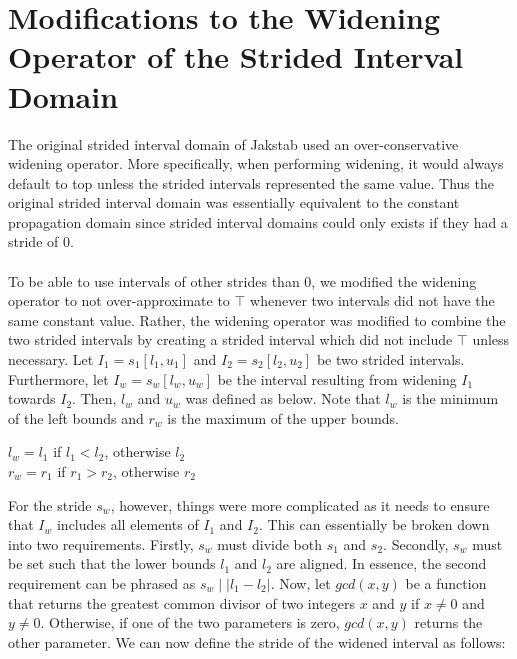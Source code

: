 \documentclass{kththesis}
\begin{document}
\clearpage
\section{Modifications to the Widening Operator of the Strided Interval Domain}
The original strided interval domain of Jakstab used an over-conservative widening operator. More specifically, when performing widening, it would always default to top unless the strided intervals represented the same value. Thus the original strided interval domain was essentially equivalent to the constant propagation domain since strided interval domains could only exists if they had a stride of $0$.
\\ \\
To be able to use intervals of other strides than $0$, we modified the widening operator to not over-approximate to $\top$ whenever two intervals did not have the same constant value. Rather, the widening operator was modified to combine the two strided intervals by creating a strided interval which did not include $\top$ unless necessary. Let $I_1=s_1[l_1,u_1]$ and $I_2=s_2[l_2,u_2]$ be two strided intervals. Furthermore, let $I_w=s_w[l_w,u_w]$ be the interval resulting from widening $I_1$ towards $I_2$. Then, $l_w$ and $u_w$ was defined as below. Note that $l_w$ is the minimum of the left bounds and $r_w$ is the maximum of the upper bounds.
\begin{center}
$l_w = l_1$ if $l_1 < l_2$, otherwise $l_2$\\
$r_w = r_1$ if $r_1 > r_2$, otherwise $r_2$
\end{center}
For the stride $s_w$, however, things were more complicated as it needs to ensure that $I_w$ includes all elements of $I_1$ and $I_2$. This can essentially be broken down into two requirements. Firstly, $s_w$ must divide both $s_1$ and $s_2$. Secondly, $s_w$ must be set such that the lower bounds $l_1$ and $l_2$ are aligned. In essence, the second requirement can be phrased as $s_w \mid \lvert l_1-l_2 \rvert$. Now, let $gcd(x,y)$ be a function that returns the greatest common divisor of two integers $x$ and $y$ if $x\neq0$ and $y\neq0$. Otherwise, if one of the two parameters is zero, $gcd(x,y)$ returns the other parameter. We can now define the stride of the widened interval as follows:
\end{document}

